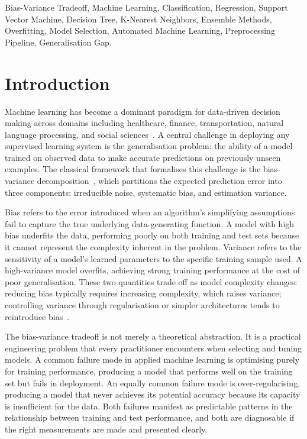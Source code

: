 \documentclass[conference]{IEEEtran}
\begin{document}
\begin{IEEEkeywords}
Bias-Variance Tradeoff, Machine Learning, Classification, Regression, Support Vector Machine, Decision Tree, K-Nearest Neighbors, Ensemble Methods, Overfitting, Model Selection, Automated Machine Learning, Preprocessing Pipeline, Generalisation Gap.
\end{IEEEkeywords}

\section{Introduction}

Machine learning has become a dominant paradigm for data-driven decision making across domains including healthcare, finance, transportation, natural language processing, and social sciences~\cite{b26}. A central challenge in deploying any supervised learning system is the generalisation problem: the ability of a model trained on observed data to make accurate predictions on previously unseen examples. The classical framework that formalises this challenge is the bias-variance decomposition~\cite{b1}, which partitions the expected prediction error into three components: irreducible noise, systematic bias, and estimation variance.

Bias refers to the error introduced when an algorithm's simplifying assumptions fail to capture the true underlying data-generating function. A model with high bias underfits the data, performing poorly on both training and test sets because it cannot represent the complexity inherent in the problem. Variance refers to the sensitivity of a model's learned parameters to the specific training sample used. A high-variance model overfits, achieving strong training performance at the cost of poor generalisation. These two quantities trade off as model complexity changes: reducing bias typically requires increasing complexity, which raises variance; controlling variance through regularisation or simpler architectures tends to reintroduce bias~\cite{b2}.

The bias-variance tradeoff is not merely a theoretical abstraction. It is a practical engineering problem that every practitioner encounters when selecting and tuning models. A common failure mode in applied machine learning is optimising purely for training performance, producing a model that performs well on the training set but fails in deployment. An equally common failure mode is over-regularising, producing a model that never achieves its potential accuracy because its capacity is insufficient for the data. Both failures manifest as predictable patterns in the relationship between training and test performance, and both are diagnosable if the right measurements are made and presented clearly.
\end{document}
